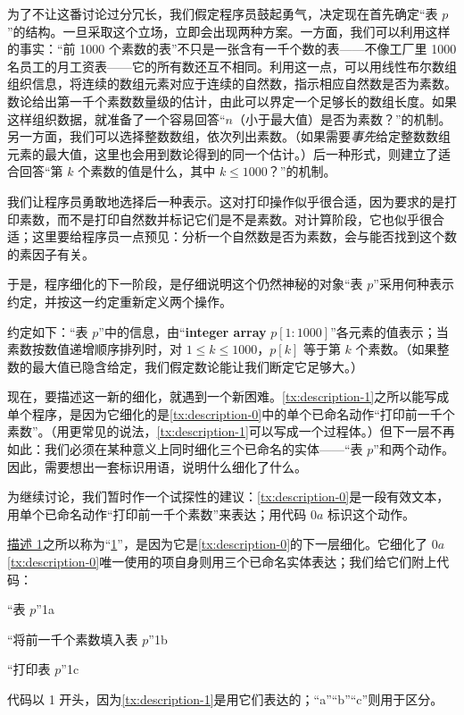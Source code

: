 \documentclass[twoside,11pt,fontset=none]{ctexbook}
\begin{document}
为了不让这番讨论过分冗长，我们假定程序员鼓起勇气，决定现在首先确定“表 $p$”的结构。一旦采取这个立场，立即会出现两种方案。一方面，我们可以利用这样的事实：“前 1000 个素数的表”不只是一张含有一千个数的表——不像工厂里 1000 名员工的月工资表——它的所有数还互不相同。利用这一点，可以用线性布尔数组组织信息，将连续的数组元素对应于连续的自然数，指示相应自然数是否为素数。数论给出第一千个素数数量级的估计，由此可以界定一个足够长的数组长度。如果这样组织数据，就准备了一个容易回答“$n$（小于最大值）是否为素数？”的机制。另一方面，我们可以选择整数数组，依次列出素数。（如果需要\textit{事先}给定整数数组元素的最大值，这里也会用到数论得到的同一个估计。）后一种形式，则建立了适合回答“第 $k$ 个素数的值是什么，其中 $k \leqslant 1000$？”的机制。

我们让程序员勇敢地选择后一种表示。这对打印操作似乎很合适，因为要求的是打印素数，而不是打印自然数并标记它们是不是素数。对计算阶段，它也似乎很合适；这里要给程序员一点预见：分析一个自然数是否为素数，会与能否找到这个数的素因子有关。

于是，程序细化的下一阶段，是仔细说明这个仍然神秘的对象“表 $p$”采用何种表示约定，并按这一约定重新定义两个操作。

约定如下：“表 $p$”中的信息，由“\textbf{integer array} $p[1 : 1000]$”各元素的值表示；当素数按数值递增顺序排列时，对 $1 \leqslant k \leqslant 1000$，$p[k]$ 等于第 $k$ 个素数。（如果整数的最大值已隐含给定，我们假定数论能让我们断定它足够大。）

现在，要描述这一新的细化，就遇到一个新困难。\ref{tx:description-1}之所以能写成单个程序，是因为它细化的是\ref{tx:description-0}中的单个已命名动作“打印前一千个素数”。（用更常见的说法，\ref{tx:description-1}可以写成一个过程体。）但下一层不再如此：我们必须在某种意义上同时细化三个已命名的实体——“表 $p$”和两个动作。因此，需要想出一套标识用语，说明什么细化了什么。

为继续讨论，我们暂时作一个试探性的建议：\ref{tx:description-0}是一段有效文本，用单个已命名动作“打印前一千个素数”来表达；用代码 $0a$ 标识这个动作。

\hyperref[tx:description-1]{描述 1}之所以称为“\hyperref[tx:description-1]{1}”，是因为它是\ref{tx:description-0}的下一层细化。它细化了 $0a$\textemdash{}\ref{tx:description-0}唯一使用的项\textemdash{}自身则用三个已命名实体表达；我们给它们附上代码：

\noindent
“表 $p$”\hfill 1a

\noindent
“将前一千个素数填入表 $p$”\hfill 1b

\noindent
“打印表 $p$”\hfill 1c

\noindent
代码以 1 开头，因为\ref{tx:description-1}是用它们表达的；“a”“b”“c”则用于区分。
\end{document}
